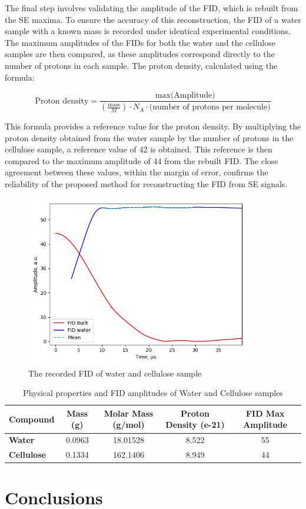 \documentclass[a4paper,12pt]{article}
\begin{document}
The final step involves validating the amplitude of the FID, which is rebuilt from the SE maxima. To ensure the accuracy of this reconstruction, the FID of a water sample with a known mass is recorded under identical experimental conditions. The maximum amplitudes of the FIDs for both the water and the cellulose samples are then compared, as these amplitudes correspond directly to the number of protons in each sample. The proton density, calculated using the formula:

\begin{equation}
  \label{eq:proton_density}
  \text{Proton density} = \frac{\text{max(Amplitude)}}{ \left(\frac{\text{mass}}{M}\right) \cdot N_A \cdot \text{(number of protons per molecule)} }
\end{equation}

This formula provides a reference value for the proton density. 
By multiplying the proton density obtained from the water sample by the number of protons in the cellulose sample, a reference value of 42 is obtained. 
This reference is then compared to the maximum amplitude of 44 from the rebuilt FID. 
The close agreement between these values, within the margin of error, confirms the reliability of the proposed method for reconstructing the FID from SE signals.

\begin{figure}[H]
  \centering
  \includegraphics[width=10cm]{images/Water_Cell_FID.png}
  \caption{The recorded FID of water and cellulose sample}
  \label{fig:Water_Cell_FID}
\end{figure}

\begin{table}[h]
  \centering
  \begin{tabular}{|l|c|c|c|c|}
  \hline
  \textbf{Compound} & \textbf{Mass (g)} & \textbf{Molar Mass (g/mol)} & \textbf{Proton Density (e-21)} & \textbf{FID Max Amplitude} \\ \hline
  \textbf{Water}    & 0.0963            & 18.01528                    & 8.522                         & 55                         \\ \hline
  \textbf{Cellulose} & 0.1334           & 162.1406                    & 8.949                         & 44                         \\ \hline
  \end{tabular}
  \caption{Physical properties and FID amplitudes of Water and Cellulose samples}
  \label{tab:fid_data}
  \end{table}
  

\newpage
\section{Conclusions}

\newpage
\printbibliography
\end{document}
